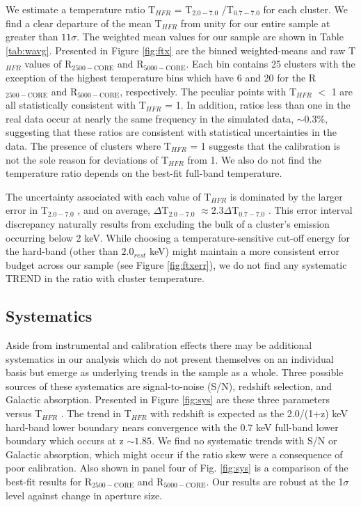 \documentclass{emulateapj}
\newcommand{\tf}{T$_{HFR}$ }
\newcommand{\hard}{T$_{2.0-7.0}$ }
\newcommand{\full}{T$_{0.7-7.0}$ }
\begin{document}
We estimate a temperature ratio \tf = \hard/\full for each
cluster. We find a clear departure of the mean \tf from unity for
our entire sample at greater than $11\sigma$. The weighted mean values
for our sample are shown in Table \ref{tab:wavg}. Presented in Figure
\ref{fig:ftx} are the binned weighted-means and raw \tf values of
R$_{2500-\text{CORE}}$ and R$_{5000-\text{CORE}}$. Each bin contains
25 clusters with the exception of the highest temperature bins which
have 6 and 20 for the  R$_{2500-\text{CORE}}$ and
R$_{5000-\text{CORE}}$, respectively. The peculiar points with \tf
$<$ 1 are all statistically consistent with \tf = 1. In addition,
ratios less than one in the real data occur at nearly the same
frequency in the simulated data, $\sim 0.3\%$, suggesting that these
ratios are consistent with statistical uncertainties in the data. The
presence of clusters where \tf = 1 suggests that the calibration is
not the sole reason for deviations of \tf from 1. We also do not
find the temperature ratio depends on the best-fit full-band
temperature.

The uncertainty associated with each value of \tf is dominated by
the larger error in \hard, and on average, $\Delta$\hard$\approx
2.3\Delta$\full. This error interval discrepancy naturally results
from excluding the bulk of a cluster's emission occurring below 2
keV. While choosing a temperature-sensitive cut-off energy for the
hard-band (other than $2.0_{rest}$ keV) might maintain a more consistent
error budget across our sample (see Figure \ref{fig:ftxerr}), we do not
find any systematic TREND in the ratio with cluster temperature. 

\subsection{Systematics} \label{sec:sys}

Aside from instrumental and calibration effects there may be
additional systematics in our analysis which do not present themselves
on an individual basis but emerge as underlying trends in the sample
as a whole. Three possible sources of these systematics
are signal-to-noise (S/N), redshift selection, and Galactic
absorption. Presented in Figure \ref{fig:sys} are these three
parameters versus \tf. The trend in \tf with redshift is expected
as the 2.0/(1+z) keV hard-band lower boundary nears convergence with
the 0.7 keV full-band lower boundary which occurs at z $\sim 1.85$. We
find no systematic trends with S/N or Galactic absorption, which might
occur if the ratio skew were a consequence of poor calibration. Also
shown in panel four of Fig. \ref{fig:sys} is a comparison of the best-fit
results for R$_{2500-\text{CORE}}$ and R$_{5000-\text{CORE}}$. Our
results are robust at the 1$\sigma$ level against change in aperture
size.
\end{document}
